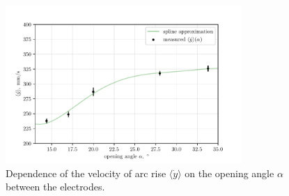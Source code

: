 \begin{figure}[htbp]
	\centering
	\includegraphics[width=0.8\textwidth]{figures/7)_mvs.pdf}
	\caption{Dependence of the velocity of arc rise $\langle \dot{y}\rangle$ on the opening angle $\alpha$ between the electrodes.}
	\label{fig:label}
\end{figure}
